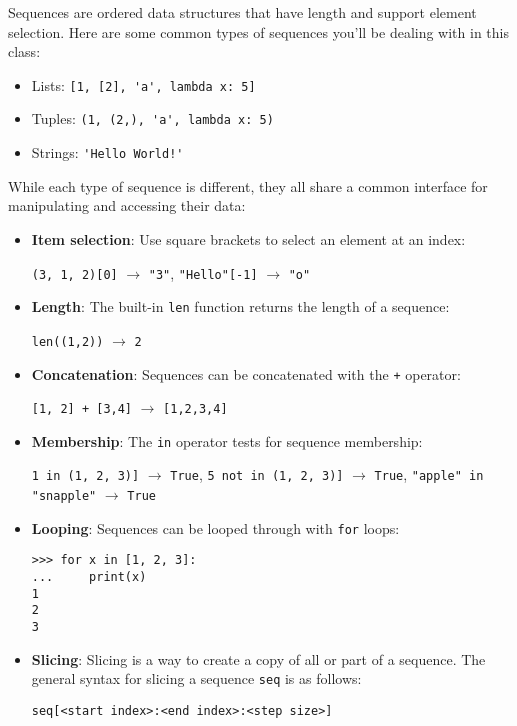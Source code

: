 Sequences are ordered data structures that have length and support element selection. Here are some common types of sequences you'll be dealing with in this class: 
\begin{itemize}
	\item Lists: \lstinline{[1, [2], 'a', lambda x: 5]}
	\item Tuples: \lstinline{(1, (2,), 'a', lambda x: 5)}
	\item Strings: \lstinline{'Hello World!'}
\end{itemize}

While each type of sequence is different, they all share a common interface for manipulating and accessing their data: 
\begin{itemize}
\item \textbf{Item selection}: Use square brackets to select an element at an index: 
	
\lstinline{(3, 1, 2)[0]} $\rightarrow$ \lstinline{"3"}, \quad \lstinline{"Hello"[-1]} $\rightarrow$ \lstinline{"o"}

\item\textbf{Length}: The built-in \lstinline{len} function returns the length of a sequence: 
	
\lstinline{len((1,2))} $\rightarrow$ \lstinline{2}

\item \textbf{Concatenation}: Sequences can be concatenated with the \lstinline{+} operator:

\lstinline{[1, 2] + [3,4]} $\rightarrow$ \lstinline{[1,2,3,4]}

\item \textbf{Membership}: The \lstinline{in} operator tests for sequence membership: 

\lstinline{1 in (1, 2, 3)]} $\rightarrow$ \lstinline{True}, \quad \lstinline{5 not in (1, 2, 3)]} $\rightarrow$ \lstinline{True}, \quad \lstinline{"apple" in "snapple"} $\rightarrow$ \lstinline{True}

\item \textbf{Looping}: Sequences can be looped through with \lstinline{for} loops: 
\begin{lstlisting}
>>> for x in [1, 2, 3]:
...     print(x)
1
2
3
\end{lstlisting}

\item \textbf{Slicing}: Slicing is a way to create a copy of all or part of a sequence. The general syntax for slicing a sequence \lstinline{seq} is as follows:
	\begin{lstlisting}
seq[<start index>:<end index>:<step size>]
	\end{lstlisting}


\end{itemize}
